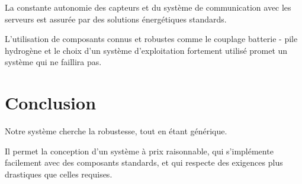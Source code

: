La constante autonomie des capteurs et du système de communication avec les serveurs est assurée par des solutions énergétiques standards.

L’utilisation de composants connus et robustes comme le couplage batterie - pile hydrogène et le choix d’un système d’exploitation fortement utilisé promet un système qui ne faillira pas.

\section{Conclusion}
Notre système cherche la robustesse, tout en étant générique.

Il permet la conception d’un système à prix raisonnable, qui s’implémente facilement avec des composants standards, et qui respecte des exigences plus drastiques que celles requises.